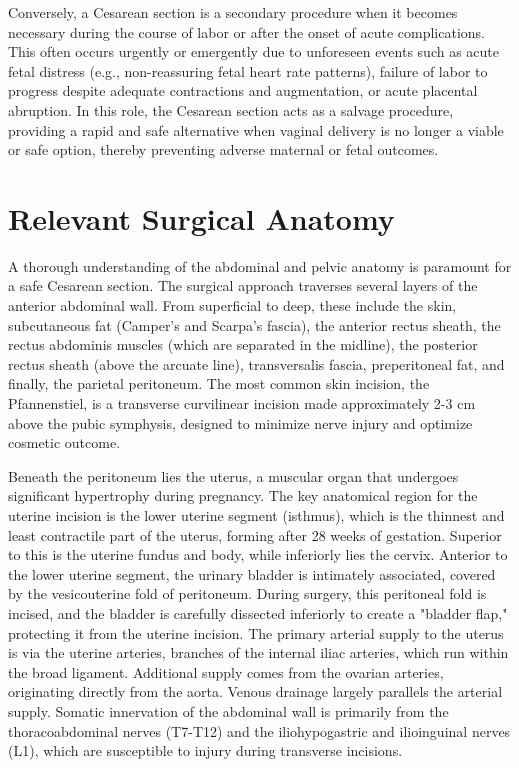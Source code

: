 Conversely, a Cesarean section is a secondary procedure when it becomes necessary during the course of labor or after the onset of acute complications. This often occurs urgently or emergently due to unforeseen events such as acute fetal distress (e.g., non-reassuring fetal heart rate patterns), failure of labor to progress despite adequate contractions and augmentation, or acute placental abruption. In this role, the Cesarean section acts as a salvage procedure, providing a rapid and safe alternative when vaginal delivery is no longer a viable or safe option, thereby preventing adverse maternal or fetal outcomes.

\section*{Relevant Surgical Anatomy}
A thorough understanding of the abdominal and pelvic anatomy is paramount for a safe Cesarean section. The surgical approach traverses several layers of the anterior abdominal wall. From superficial to deep, these include the skin, subcutaneous fat (Camper's and Scarpa's fascia), the anterior rectus sheath, the rectus abdominis muscles (which are separated in the midline), the posterior rectus sheath (above the arcuate line), transversalis fascia, preperitoneal fat, and finally, the parietal peritoneum. The most common skin incision, the Pfannenstiel, is a transverse curvilinear incision made approximately 2-3 cm above the pubic symphysis, designed to minimize nerve injury and optimize cosmetic outcome.

Beneath the peritoneum lies the uterus, a muscular organ that undergoes significant hypertrophy during pregnancy. The key anatomical region for the uterine incision is the lower uterine segment (isthmus), which is the thinnest and least contractile part of the uterus, forming after 28 weeks of gestation. Superior to this is the uterine fundus and body, while inferiorly lies the cervix. Anterior to the lower uterine segment, the urinary bladder is intimately associated, covered by the vesicouterine fold of peritoneum. During surgery, this peritoneal fold is incised, and the bladder is carefully dissected inferiorly to create a "bladder flap," protecting it from the uterine incision. The primary arterial supply to the uterus is via the uterine arteries, branches of the internal iliac arteries, which run within the broad ligament. Additional supply comes from the ovarian arteries, originating directly from the aorta. Venous drainage largely parallels the arterial supply. Somatic innervation of the abdominal wall is primarily from the thoracoabdominal nerves (T7-T12) and the iliohypogastric and ilioinguinal nerves (L1), which are susceptible to injury during transverse incisions.

